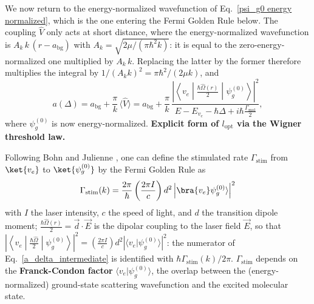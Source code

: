 We now return to the energy-normalized wavefunction of
Eq.~\ref{psi_g0 energy normalized}, which is the one entering the Fermi Golden Rule
below. The coupling $\hat V$ only acts at short distance, where the energy-normalized
wavefunction is $A_k\,k\,(r-a_{\text{bg}})$ with $A_k=\sqrt{2\mu/(\pi\hbar^2k)}$: it is
equal to the zero-energy-normalized one multiplied by $A_k\,k$. Replacing the latter by
the former therefore multiplies the integral by $1/(A_k k)^2=\pi\hbar^2/(2\mu k)$, and
\begin{equation}
    a(\Delta) = a_{\text{bg}} + \frac{\pi}{k}\,\langle\hat V\rangle
    = a_{\text{bg}} + \frac{\pi}{k}\,
    \frac{\left|\left\langle v_e\middle|\frac{\hbar\hat\Omega(r)}{2}\middle|\psi_g^{(0)}\right\rangle\right|^2}
    {E-E_{v_e}-\hbar\Delta+i\hbar\frac{\Gamma_{\text{mol}}}{2}},
    \label{a_delta_intermediate}
\end{equation}
where $\psi_g^{(0)}$ is now energy-normalized.
\textbf{Explicit form of $l_{\text{opt}}$ via the Wigner threshold law.}

Following Bohn and Julienne \cite{bohn1997_prospects}, one can define the
stimulated rate $\Gamma_{\text{stim}}$ from $\ket{v_e}$ to $\ket{\psi_g^{(0)}}$
by the Fermi Golden Rule as
\begin{equation}
    \Gamma_{\text{stim}}(k) = \frac{2\pi}{\hbar}\left(\frac{2\pi I}{c}\right)d^2\left| \bra{v_e} \psi_g^{(0)} \rangle \right|^2
    \label{gamma_stim_def}
\end{equation}
with $I$ the laser intensity, $c$ the speed of light, and $d$ the transition
dipole moment; $\frac{\hbar\hat\Omega(r)}{2}=\vec d\cdot\vec E$ is the dipolar
coupling to the laser field $\vec E$, so that
$\left|\left\langle v_e\middle|\frac{\hbar\hat\Omega}{2}\middle|\psi_g^{(0)}\right\rangle\right|^2
=\left(\frac{2\pi I}{c}\right)d^2\left|\langle v_e\vert\psi_g^{(0)}\rangle\right|^2$: the
numerator of Eq.~\ref{a_delta_intermediate} is identified with
$\hbar\Gamma_{\text{stim}}(k)/2\pi$. $\Gamma_{\text{stim}}$ depends on the \textbf{Franck-Condon factor} $\langle v_e\vert\psi_g^{(0)}\rangle$,
the overlap between the (energy-normalized) ground-state scattering
wavefunction and the excited molecular state.

